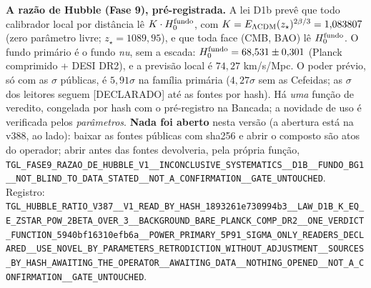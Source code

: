 \documentclass[11pt]{article}
\theoremstyle{definition}\newtheorem{deriv}{Derivação}
\begin{document}
\textbf{A razão de Hubble (Fase 9), pré-registrada.} A lei D1b prevê que todo calibrador local por distância lê $K\cdot H_0^{\rm fundo}$, com $K=E_{\Lambda\rm CDM}(z_\star)^{2\beta/3}=1{,}083807$ (zero parâmetro livre; $z_\star=1089{,}95$), e que toda face (CMB, BAO) lê $H_0^{\rm fundo}$. O fundo primário é o fundo \emph{nu}, sem a escada: $H_0^{\rm fundo}=68{,}531\pm0{,}301$ (Planck comprimido + DESI DR2), e a previsão local é $74{,}27$ km/s/Mpc. O poder prévio, só com as $\sigma$ públicas, é $5{,}91\sigma$ na família primária ($4{,}27\sigma$ sem as Cefeidas; as $\sigma$ dos leitores seguem \textsf{[DECLARADO]} até as fontes por hash). Há \emph{uma} função de veredito, congelada por hash com o pré-registro na Bancada; a novidade de uso é verificada pelos \emph{parâmetros}. \textbf{Nada foi aberto} nesta versão (a abertura está na v388, ao lado): baixar as fontes públicas com sha256 e abrir o composto são atos do operador; abrir antes das fontes devolveria, pela própria função, \texttt{TGL\_\allowbreak{}FASE9\_\allowbreak{}RAZAO\_\allowbreak{}DE\_\allowbreak{}HUBBLE\_\allowbreak{}V1\_\allowbreak{}\_\allowbreak{}INCONCLUSIVE\_\allowbreak{}SYSTEMATICS\_\allowbreak{}\_\allowbreak{}D1B\_\allowbreak{}\_\allowbreak{}FUNDO\_\allowbreak{}BG1\_\allowbreak{}\_\allowbreak{}NOT\_\allowbreak{}BLIND\_\allowbreak{}TO\_\allowbreak{}DATA\_\allowbreak{}STATED\_\allowbreak{}\_\allowbreak{}NOT\_\allowbreak{}A\_\allowbreak{}CONFIRMATION\_\allowbreak{}\_\allowbreak{}GATE\_\allowbreak{}UNTOUCHED}. Registro: \texttt{TGL\_\allowbreak{}HUBBLE\_\allowbreak{}RATIO\_\allowbreak{}V387\_\allowbreak{}\_\allowbreak{}V1\_\allowbreak{}READ\_\allowbreak{}BY\_\allowbreak{}HASH\_\allowbreak{}1893261e730994b3\_\allowbreak{}\_\allowbreak{}LAW\_\allowbreak{}D1B\_\allowbreak{}K\_\allowbreak{}EQ\_\allowbreak{}E\_\allowbreak{}ZSTAR\_\allowbreak{}POW\_\allowbreak{}2BETA\_\allowbreak{}OVER\_\allowbreak{}3\_\allowbreak{}\_\allowbreak{}BACKGROUND\_\allowbreak{}BARE\_\allowbreak{}PLANCK\_\allowbreak{}COMP\_\allowbreak{}DR2\_\allowbreak{}\_\allowbreak{}ONE\_\allowbreak{}VERDICT\_\allowbreak{}FUNCTION\_\allowbreak{}5940bf16310efb6a\_\allowbreak{}\_\allowbreak{}POWER\_\allowbreak{}PRIMARY\_\allowbreak{}5P91\_\allowbreak{}SIGMA\_\allowbreak{}ONLY\_\allowbreak{}READERS\_\allowbreak{}DECLARED\_\allowbreak{}\_\allowbreak{}USE\_\allowbreak{}NOVEL\_\allowbreak{}BY\_\allowbreak{}PARAMETERS\_\allowbreak{}RETRODICTION\_\allowbreak{}WITHOUT\_\allowbreak{}ADJUSTMENT\_\allowbreak{}\_\allowbreak{}SOURCES\_\allowbreak{}BY\_\allowbreak{}HASH\_\allowbreak{}AWAITING\_\allowbreak{}THE\_\allowbreak{}OPERATOR\_\allowbreak{}\_\allowbreak{}AWAITING\_\allowbreak{}DATA\_\allowbreak{}\_\allowbreak{}NOTHING\_\allowbreak{}OPENED\_\allowbreak{}\_\allowbreak{}NOT\_\allowbreak{}A\_\allowbreak{}CONFIRMATION\_\allowbreak{}\_\allowbreak{}GATE\_\allowbreak{}UNTOUCHED}.
\end{document}
